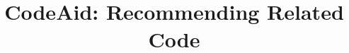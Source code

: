 \documentclass[conference]{IEEEtran}
\begin{document}
\newcommand\todo[1]{\textcolor{red}{TODO: #1}}

\makeatletter
\newcommand{\removelatexerror}{\let\@latex@error\@gobble}
\makeatother

\title{CodeAid: Recommending Related Code
}


\maketitle
\end{document}
